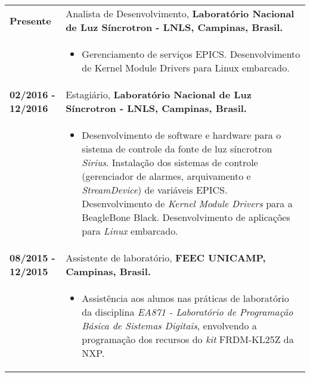 \documentclass[10pt, a4paper]{article}
\begin{document}
\begin{tabular}{p{} p{}}


\textbf{Presente}  & Analista de Desenvolvimento, \textbf{Laboratório Nacional
de Luz Síncrotron - LNLS, Campinas, Brasil.}
\\
  & \vspace{-12pt}
  \begin{itemize}
    \item Gerenciamento de serviços EPICS. Desenvolvimento de Kernel Module Drivers para Linux embarcado.
	\end{itemize}\\

\textbf{02/2016 - 12/2016}  & Estagiário, \textbf{Laboratório Nacional
de Luz Síncrotron - LNLS, Campinas, Brasil.}
\\
& \vspace{-12pt}
\begin{itemize}
  \item Desenvolvimento de software e hardware para o sistema de controle da
  fonte de luz síncrotron \textit{Sirius}. Instalação dos sistemas de
  controle (gerenciador de alarmes, arquivamento e \textit{StreamDevice}) de variáveis EPICS. Desenvolvimento de
  \textit{Kernel Module Drivers} para a BeagleBone Black. Desenvolvimento
  de aplicações para \textit{Linux} embarcado.
  
\end{itemize}\\


\textbf{08/2015 - 12/2015}  & Assistente de laboratório, \textbf{FEEC
UNICAMP, Campinas, Brasil.}
\\
& \vspace{-12pt}
\begin{itemize}
  \item Assistência aos alunos nas práticas de laboratório da
  disciplina \textit{EA871 - Laboratório de Programação Básica de Sistemas
  Digitais}, envolvendo a programação dos recursos do \textit{kit} FRDM-KL25Z
  da NXP.
  
\end{itemize}\\



\end{tabular}
\end{document}
